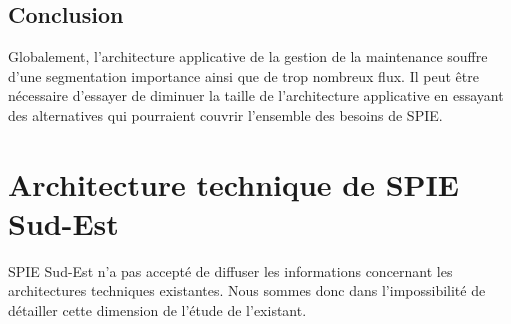 \subsection{Conclusion}

Globalement, l’architecture applicative de la gestion de la maintenance souffre d’une segmentation importance ainsi que de trop nombreux flux. Il peut être nécessaire d’essayer de diminuer la taille de l’architecture applicative en essayant des alternatives qui pourraient couvrir l’ensemble des besoins de SPIE.

\section{Architecture technique de SPIE Sud-Est}

SPIE Sud-Est n'a pas accepté de diffuser les informations concernant les architectures techniques existantes. Nous sommes donc dans l'impossibilité de détailler cette dimension de l'étude de l'existant.